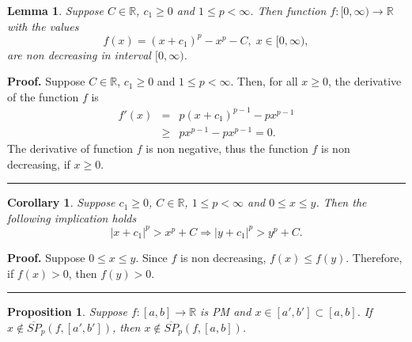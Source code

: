 \documentclass[12pt, a4paper]{article}
\newtheorem{lemma}[theorem]{Lemma}
\newtheorem{proposition}[theorem]{Proposition}
\newtheorem{corollary}[theorem]{Corollary}
\newenvironment{proof}[1][Proof]{\noindent \textbf{#1.} }{\  \rule{0.5em}{0.5em}}
\numberwithin{equation}{section}
\begin{document}
\begin{lemma}\label{prop:Sp_Monoton}
  Suppose $C \in \mathbb{R}$, 
  $c_1\geq0$ and $1\leq p<\infty$. 
  Then function
  $f:[0,\infty) \rightarrow \mathbb{R}$ with the values
  \begin{equation}
  f(x) = ( x + c_1  )^p - x^p - C,\;x \in [0,\infty),  
  \end{equation}
  are non decreasing in interval $[0,\infty)$. 
\end{lemma}
\begin{proof}
  Suppose $C \in \mathbb{R}$, $c_1\geq0$ and $1\leq p<\infty$. 
  Then, for all $x \geq 0$, the derivative of the function $f$ is
  \begin{eqnarray*} 
    f'(x)   &=& p(x+c_1)^{p-1} - px^{p-1} \\
          &\geq& px^{p-1} - px^{p-1} = 0.
  \end{eqnarray*}  
  The derivative of function $f$ is non negative, 
  thus the function $f$ is non decreasing, if $x \geq 0$.
\end{proof}
\begin{corollary}\label{cor:convex}
  Suppose $c_1\geq0$, $C \in \mathbb{R}$, $1\leq p<\infty$ 
  and $0 \leq x \leq y$. 
  Then the following implication holds 
  \begin{equation}
  |x + c_1 |^p > x^p + C \Rightarrow |y + c_1 |^{p} > y^{p} + C.  
  \end{equation}
\end{corollary}
\begin{proof}
  Suppose  $0 \leq x \leq y$. 
  Since $f$ is non decreasing, $f(x) \leq f(y)$.
  Therefore, if $f(x)>0$, then $f(y)>0$.
\end{proof}


\begin{proposition}\label{prop:notinST} 
  Suppose $f:[a,b] \rightarrow \mathbb{R}$ is PM and
  $x \in [a', b'] \subset [a,b]$.    
  If $x \notin \overline{SP}_p(f, [a', b'])$, then 
  $x \notin \overline{SP}_p(f, [a, b])$. 
\end{proposition}
\end{document}

